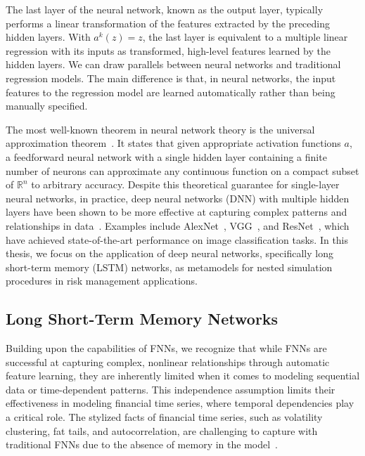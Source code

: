 The last layer of the neural network, known as the output layer, typically performs a linear transformation of the features extracted by the preceding hidden layers.
With $a^{k}(z) = z$, the last layer is equivalent to a multiple linear regression with its inputs as transformed, high-level features learned by the hidden layers.
We can draw parallels between neural networks and traditional regression models.
The main difference is that, in neural networks, the input features to the regression model are learned automatically rather than being manually specified.

The most well-known theorem in neural network theory is the universal approximation theorem~\citep{hornik1989multilayer}.
It states that given appropriate activation functions $a$, a feedforward neural network with a single hidden layer containing a finite number of neurons can approximate any continuous function on a compact subset of $\mathbb{R}^n$ to arbitrary accuracy.
Despite this theoretical guarantee for single-layer neural networks, in practice, deep neural networks (DNN) with multiple hidden layers have been shown to be more effective at capturing complex patterns and relationships in data~\citep{lecun2015deep}.
Examples include AlexNet~\citep{krizhevsky2012imagenet}, VGG~\citep{simonyan2014very}, and ResNet~\citep{he2016deep}, which have achieved state-of-the-art performance on image classification tasks.
In this thesis, we focus on the application of deep neural networks, specifically long short-term memory (LSTM) networks, as metamodels for nested simulation procedures in risk management applications.

\subsection{Long Short-Term Memory Networks} \label{subsec:LSTM}

Building upon the capabilities of FNNs, we recognize that while FNNs are successful at capturing complex, nonlinear relationships through automatic feature learning, they are inherently limited when it comes to modeling sequential data or time-dependent patterns.
This independence assumption limits their effectiveness in modeling financial time series, where temporal dependencies play a critical role.
The stylized facts of financial time series, such as volatility clustering, fat tails, and autocorrelation, are challenging to capture with traditional FNNs due to the absence of memory in the model~\citep{cont2001empirical}.

